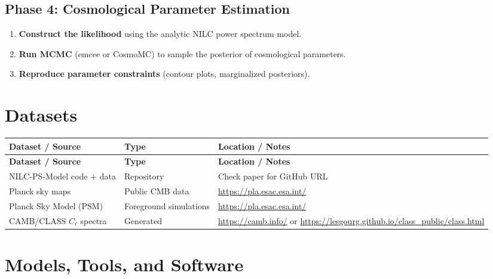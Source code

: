 \documentclass[11pt,a4paper]{article}
\begin{document}
\subsection{Phase 4: Cosmological Parameter Estimation}
\begin{enumerate}[label=\textbf{4.\arabic*}]
  \item \textbf{Construct the likelihood} using the analytic NILC power spectrum model.
  \item \textbf{Run MCMC} (emcee or CosmoMC) to sample the posterior of cosmological parameters.
  \item \textbf{Reproduce parameter constraints} (contour plots, marginalized posteriors).
\end{enumerate}

\section{Datasets}

\begin{longtable}{p{4.5cm} p{3.5cm} p{6cm}}
\toprule
\textbf{Dataset / Source} & \textbf{Type} & \textbf{Location / Notes} \\
\midrule
\endfirsthead
\toprule
\textbf{Dataset / Source} & \textbf{Type} & \textbf{Location / Notes} \\
\midrule
\endhead
NILC-PS-Model code + data & Repository & Check paper for GitHub URL \\
\midrule
Planck sky maps & Public CMB data & \url{https://pla.esac.esa.int/} \\
\midrule
Planck Sky Model (PSM) & Foreground simulations & \url{https://pla.esac.esa.int/} \\
\midrule
CAMB/CLASS $C_\ell$ spectra & Generated & \url{https://camb.info/} or \url{https://lesgourg.github.io/class_public/class.html} \\
\bottomrule
\end{longtable}

\section{Models, Tools, and Software}
\end{document}
